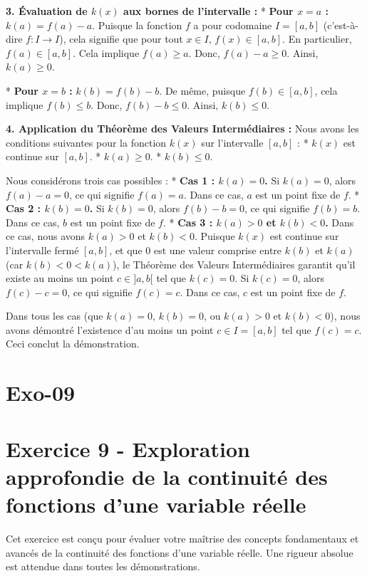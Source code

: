 \documentclass[12pt,a4paper]{report}
\begin{document}
\textbf{3. Évaluation de $k(x)$ aux bornes de l'intervalle :}
*   \textbf{Pour $x=a$ :}
    $k(a) = f(a) - a$.
    Puisque la fonction $f$ a pour codomaine $I = [a, b]$ (c'est-à-dire $f: I \to I$), cela signifie que pour tout $x \in I$, $f(x) \in [a, b]$.
    En particulier, $f(a) \in [a, b]$. Cela implique $f(a) \ge a$.
    Donc, $f(a) - a \ge 0$.
    Ainsi, $k(a) \ge 0$.

*   \textbf{Pour $x=b$ :}
    $k(b) = f(b) - b$.
    De même, puisque $f(b) \in [a, b]$, cela implique $f(b) \le b$.
    Donc, $f(b) - b \le 0$.
    Ainsi, $k(b) \le 0$.

\textbf{4. Application du Théorème des Valeurs Intermédiaires :}
Nous avons les conditions suivantes pour la fonction $k(x)$ sur l'intervalle $[a, b]$ :
*   $k(x)$ est continue sur $[a, b]$.
*   $k(a) \ge 0$.
*   $k(b) \le 0$.

Nous considérons trois cas possibles :
*   \textbf{Cas 1 : $k(a) = 0$.}
    Si $k(a) = 0$, alors $f(a) - a = 0$, ce qui signifie $f(a) = a$. Dans ce cas, $a$ est un point fixe de $f$.
*   \textbf{Cas 2 : $k(b) = 0$.}
    Si $k(b) = 0$, alors $f(b) - b = 0$, ce qui signifie $f(b) = b$. Dans ce cas, $b$ est un point fixe de $f$.
*   \textbf{Cas 3 : $k(a) > 0$ et $k(b) < 0$.}
    Dans ce cas, nous avons $k(a) > 0$ et $k(b) < 0$. Puisque $k(x)$ est continue sur l'intervalle fermé $[a, b]$, et que $0$ est une valeur comprise entre $k(b)$ et $k(a)$ (car $k(b) < 0 < k(a)$), le Théorème des Valeurs Intermédiaires garantit qu'il existe au moins un point $c \in ]a, b[$ tel que $k(c) = 0$.
    Si $k(c) = 0$, alors $f(c) - c = 0$, ce qui signifie $f(c) = c$. Dans ce cas, $c$ est un point fixe de $f$.

Dans tous les cas (que $k(a)=0$, $k(b)=0$, ou $k(a)>0$ et $k(b)<0$), nous avons démontré l'existence d'au moins un point $c \in I = [a, b]$ tel que $f(c) = c$.
Ceci conclut la démonstration.

\section{Exo-09}
\section{Exercice 9 - Exploration approfondie de la continuité des fonctions d'une variable réelle}

Cet exercice est conçu pour évaluer votre maîtrise des concepts fondamentaux et avancés de la continuité des fonctions d'une variable réelle. Une rigueur absolue est attendue dans toutes les démonstrations.
\end{document}
